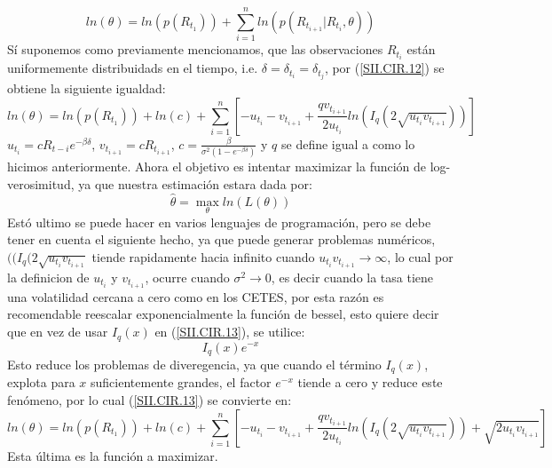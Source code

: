 \documentclass[11pt,notitlepage]{article}
\begin{document}
    \[ln(\theta) = ln\left(p\left(R_{t_1}\right)\right) + \sum_{i = 1}^{n}ln\left(p\left(R_{t_{i+1}}|R_{t_i},\theta \right)\right)\]
     Sí suponemos como previamente mencionamos, que las observaciones \(R_{t_i}\) están uniformemente distribuidads en el tiempo, i.e. \(\delta = \delta_{t_i} = \delta_{t_j}\), por (\ref{SII.CIR.12}) se obtiene la siguiente igualdad: 
    \begin{equation}\label{SII.CIR.13}
                 ln(\theta) = ln\left(p\left(R_{t_1}\right)\right) + ln\left(c\right) +    \sum_{i=1}^{n}\left[-u_{t_i} - v_{t_{i+1}} + \frac{qv_{t_{i+1}}}{2u_{t_i}}  ln\left(I_{q}(2\sqrt{u_{t_i}v_{t_{i+1}}})\right)\right] 
    \end{equation}
    \(u_{t_i} = cR_{t-i}e^{-\beta \delta}\), \(v_{t_{i+1}} = cR_{t_{i+1}}\), \(c = \frac{\beta}{\sigma^2\left(1 - e^{-\beta\delta}\right)}\) y \(q\) se define igual a como lo hicimos anteriormente. Ahora el objetivo es intentar maximizar la función de log-verosimitud, ya que nuestra estimación estara dada por:
    \[\hat{\theta} = \max_{\theta}ln(L(\theta))\]
    Estó ultimo se puede hacer en varios lenguajes de programación, pero se debe tener en cuenta el siguiente hecho, ya que puede generar problemas numéricos, \(((I_{q}(2\sqrt{u_{t_i}v_{t_{i+1}}}\) tiende rapidamente hacia infinito cuando \(u_{t_i}v_{t_{i+1}} \to \infty\), lo cual por la definicion de \(u_{t_i}\) y \(v_{t_{i+1}}\), ocurre cuando \(\sigma^2 \to 0\), es decir cuando la tasa tiene una volatilidad cercana a cero como en los CETES, por esta razón es recomendable reescalar exponencialmente la función de bessel, esto quiere decir que en vez de usar \(I_{q}(x)\) en (\ref{SII.CIR.13}), se utilice: 
    \[I_{q}(x)e^{-x}\]
    Esto reduce los problemas de diveregencia, ya que cuando el término \(I_{q}(x)\), explota para \(x\) suficientemente grandes, 
    el factor \(e^{-x}\) tiende a cero y reduce este fenómeno, por lo cual (\ref{SII.CIR.13}) se convierte en: 
    \begin{equation*}
         ln(\theta) = ln\left(p\left(R_{t_1}\right)\right) + ln\left(c\right) +    \sum_{i=1}^{n}\left[-u_{t_i} - v_{t_{i+1}} + \frac{qv_{t_{i+1}}}{2u_{t_i}}  ln\left(I_{q}(2\sqrt{u_{t_i}v_{t_{i+1}}})\right) + \sqrt{2u_{t_i}v_{t_{i+1}}}\right] 
    \end{equation*}
    Esta última es la función a maximizar. 
    
\end{document}
